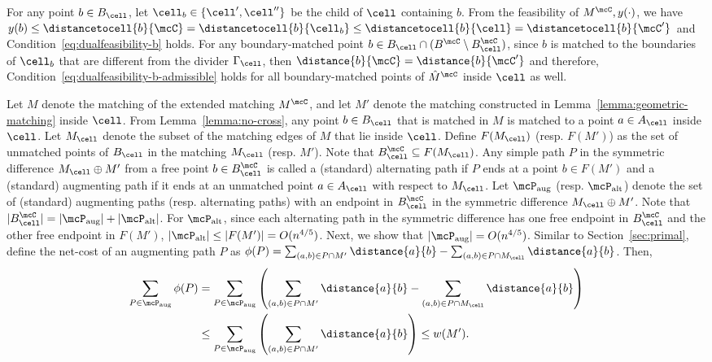 For any point $b\in B_\cell$, let $\cell_b\in\{\cell', \cell''\}$ be the child of $\cell$ containing $b$. From the feasibility of $M^\mcC, y(\cdot)$, we have $y(b)\le \distancetocell{b}{\mcC}=\distancetocell{b}{\cell_b} \le \distancetocell{b}{\cell}=\distancetocell{b}{\mcC'}$ and Condition~\eqref{eq:dualfeasibility-b} holds. For any boundary-matched point $b\in B_\cell \cap (B^\mcC\setminus B_\cell^\mcC)$, since $b$ is matched to the boundaries of $\cell_b$ that are different from the divider $\Gamma_\cell$, then $\distance{b}{\mcC}=\distance{b}{\mcC'}$ and therefore, Condition~\eqref{eq:dualfeasibility-b-admissible} holds for all boundary-matched points of $\hat{M}^\mcC$ inside $\cell$ as well.



 Let $M$ denote the matching of the extended matching $M^\mcC$, and let $M'$ denote the matching constructed in Lemma~\ref{lemma:geometric-matching} inside $\cell$. From Lemma~\ref{lemma:no-cross}, any point $b\in B_\cell$ that is matched in $M$ is matched to a point $a\in A_\cell$ inside $\cell$. Let $M_\cell$ denote the subset of the matching edges of $M$ that lie inside $\cell$. Define $F(M_\cell)$ (resp. $F(M')$) as the set of unmatched points of $B_\cell$ in the matching $M_\cell$ (resp. $M'$). Note that $B_\cell^\mcC\subseteq F(M_\cell)$. Any simple path $P$ in the symmetric difference $M_\cell\oplus M'$ from a free point $b\in B_\cell^\mcC$ is called a (standard) alternating path if $P$ ends at a point $b\in F(M')$ and a (standard) augmenting path if it ends at an unmatched point $a\in A_\cell$ with respect to $M_\cell$.  Let $\mcP_{\mathrm{aug}}$ (resp. $\mcP_{\mathrm{alt}}$) denote the set of (standard) augmenting paths (resp. alternating paths) with an endpoint in $B_\cell^\mcC$ in the symmetric difference $M_\cell\oplus M'$. Note that $|B_\cell^\mcC|=|\mcP_{\mathrm{aug}}| + |\mcP_{\mathrm{alt}}|$. For $\mcP_{\mathrm{alt}}$, since each alternating path in the symmetric difference has one free endpoint in $B_\cell^\mcC$ and the other free endpoint in $F(M')$, $|\mcP_{\mathrm{alt}}|\le |F(M')|=O(n^{4/5})$. 
Next, we show that $|\mcP_{\mathrm{aug}}|=O(n^{4/5})$.
Similar to Section~\ref{sec:primal}, define the net-cost of an augmenting path $P$ as $\phi(P) = \sum_{(a,b)\in P\cap M'}\distance{a}{b} - \sum_{(a,b)\in P\cap M_\cell}\distance{a}{b}$. Then,
\begin{align}
    \sum_{P\in \mcP_{\mathrm{aug}}} \phi(P) &= \sum_{P\in \mcP_{\mathrm{aug}}} \left(\sum_{(a,b)\in P\cap M'}\distance{a}{b} - \sum_{(a,b)\in P\cap M_\cell}\distance{a}{b} \right)\nonumber\\ &\le \sum_{P\in \mcP_{\mathrm{aug}}} \left(\sum_{(a,b)\in P\cap M'}\distance{a}{b}\right)\le w(M').\label{eq:net-cost-sum-1}
\end{align}
